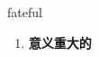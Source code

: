 
\begin{frame}
{\huge fateful}
\begin{center}
\begin{enumerate}\Large
  \item \textbf{意义重大的}
\end{enumerate}
\end{center}
\end{frame}
